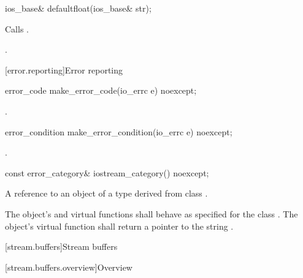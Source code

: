 %
\begin{itemdecl}
ios_base& defaultfloat(ios_base& str);
\end{itemdecl}

\begin{itemdescr}
\pnum
\effects
Calls .

\pnum
\returns {}.
\end{itemdescr}

[error.reporting]{Error reporting}

%
\begin{itemdecl}
error_code make_error_code(io_errc e) noexcept;
\end{itemdecl}

\begin{itemdescr}
\pnum
\returns {}.
\end{itemdescr}

%
\begin{itemdecl}
error_condition make_error_condition(io_errc e) noexcept;
\end{itemdecl}

\begin{itemdescr}
\pnum
\returns {}.
\end{itemdescr}

%
\begin{itemdecl}
const error_category& iostream_category() noexcept;
\end{itemdecl}

\begin{itemdescr}
\pnum
\returns A reference to an object of a type derived from class
.

\pnum
The object's  and  virtual functions shall behave as specified for the class . The object's  virtual function shall return a pointer to the string .
\end{itemdescr}


[stream.buffers]{Stream buffers}

[stream.buffers.overview]{Overview}

%

